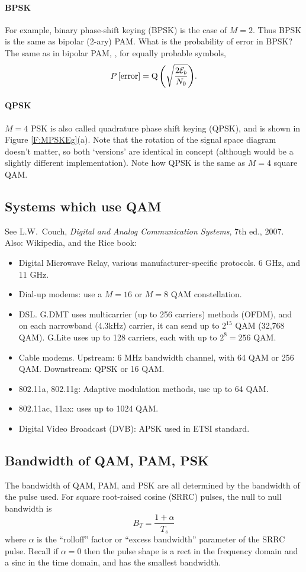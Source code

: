 \paragraph{BPSK}

For example, binary phase-shift keying (BPSK) is the case of $M=2$.
Thus BPSK is the same as bipolar (2-ary) PAM.   What is the
probability of error in BPSK?  The same as in bipolar PAM, \ie, for
equally probable symbols,
\[
    P\left[{\mbox{error}}\right] = {\mbox{Q}\left( { \sqrt{\frac{2\mathcal{E}_b }{N_0}}} \right)}.
\]

\paragraph{QPSK}

$M=4$ PSK is also called quadrature phase shift keying (QPSK), and
is shown in Figure \ref{F:MPSKEg}(a).  Note that the rotation of the
signal space diagram doesn't matter, so both `versions' are
identical in concept (although would be a slightly different
implementation).  Note how QPSK is the same as $M=4$ square QAM.

\subsection{Systems which use QAM}

See L.W.~Couch, \emph{Digital and Analog Communication Systems}, 7th ed., 2007. Also: Wikipedia, and the Rice book:
\begin{itemize}
  \item Digital Microwave Relay, various manufacturer-specific
    protocols.  6 GHz, and 11 GHz.
  \item Dial-up modems: use a $M=16$ or $M=8$ QAM constellation.
  \item DSL.  G.DMT uses multicarrier (up to 256 carriers) methods (OFDM), and on each narrowband
    (4.3kHz) carrier, it can send up to $2^{15}$ QAM (32,768 QAM).
    G.Lite uses up to 128 carriers, each with up to $2^8=256$ QAM.
  \item Cable modems.  Upstream:  6 MHz bandwidth channel, with 64
    QAM or 256 QAM.  Downstream:  QPSK or 16 QAM.
  \item 802.11a, 802.11g:  Adaptive modulation methods, use up to 64 QAM.
  \item 802.11ac, 11ax: uses up to 1024 QAM.
  \item Digital Video Broadcast (DVB): APSK used in ETSI standard.
\end{itemize}


\subsection{Bandwidth of QAM, PAM, PSK}

The bandwidth of QAM, PAM, and PSK are all determined by the bandwidth of the pulse used.  For square root-raised cosine (SRRC) pulses, the null to null bandwidth is 
\[
 B_T = \frac{1+\alpha}{T_s}
\]
where $\alpha$ is the ``rolloff'' factor or ``excess bandwidth'' parameter of the SRRC pulse.  Recall if $\alpha=0$ then the pulse shape is a rect in the frequency domain and a sinc in the time domain, and has the smallest bandwidth.  


